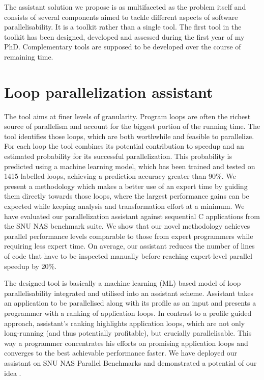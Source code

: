 \quad The assistant solution we propose is as multifaceted as the problem itself and consists of several components aimed to tackle different aspects of software parallelisability. It is a toolkit rather than a single tool. The first tool in the toolkit has been designed, developed and assessed during the first year of my PhD. Complementary tools are supposed to be developed over the course of remaining time.\newline\null

\section{Loop parallelization assistant}
\label{introduction_assistant}
\quad The tool aims at finer levels of granularity. Program loops are often the richest source of parallelism and account for the biggest portion of the running time. The tool identifies those loops, which are both worthwhile and feasible to parallelize. For each loop the tool combines its potential contribution to speedup and an estimated probability for its successful parallelization. This probability is predicted using a machine learning model, which has been trained and tested on 1415 labelled loops, achieving a prediction accuracy greater than 90\%. We present a methodology which makes a better use of an expert time by guiding them directly towards those loops, where the largest performance gains can be expected while keeping analysis and transformation effort at a minimum. We have evaluated our parallelization assistant against sequential C applications from the SNU NAS benchmark suite. We show that our novel methodology achieves parallel performance levels comparable to those from expert programmers while requiring less expert time. On average, our assistant reduces the number of lines of code that have to be inspected manually before reaching expert-level parallel speedup by 20\%.

\quad The designed tool is basically a machine learning (ML) based model of loop parallelisability integrated and utilised into an assistant scheme. Assistant takes an application to be parallelised along with its profile as an input and presents a programmer with a ranking of application loops. In contrast to a profile guided approach, assistant's ranking highlights application loops, which are not only long-running (and thus potentially profitable), but crucially parallelisable. This way a programmer concentrates his efforts on promising application loops and converges to the best achievable performance faster. We have deployed our assistant on SNU NAS Parallel Benchmarks \cite{snu-npb-benchmarks} \cite{nasa-parallel-benchmarks} and demonstrated a potential of our idea \cite{aiseps}.\newline\null

